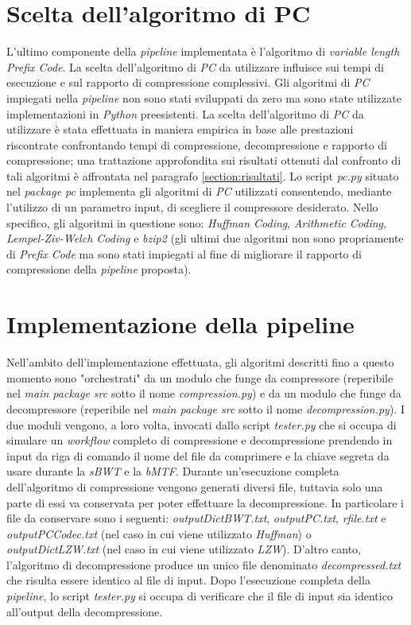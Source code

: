 \section{Scelta dell'algoritmo di PC} 
L'ultimo componente della \emph{pipeline} implementata è l'algoritmo di \emph{variable length Prefix Code}. La scelta dell'algoritmo di \emph{PC} da utilizzare influisce sui tempi di esecuzione e sul rapporto di compressione complessivi. Gli algoritmi di \emph{PC} impiegati nella \emph{pipeline} non sono stati sviluppati da zero ma sono state utilizzate implementazioni in \emph{Python} preesistenti. La scelta dell'algoritmo di \emph{PC} da utilizzare è stata effettuata in maniera empirica in base alle prestazioni riscontrate confrontando tempi di compressione, decompressione e rapporto di compressione; una trattazione approfondita sui risultati ottenuti dal confronto di tali algoritmi è affrontata nel paragrafo \ref{section:risultati}. Lo script \emph{pc.py} situato nel \emph{package pc} implementa gli algoritmi di \emph{PC} utilizzati consentendo, mediante l'utilizzo di un parametro input, di scegliere il compressore desiderato. Nello specifico, gli algoritmi in questione sono: \emph{Huffman Coding}, \emph{Arithmetic Coding}, \emph{Lempel-Ziv-Welch Coding} e \emph{bzip2} (gli ultimi due algoritmi non sono propriamente di \emph{Prefix Code} ma sono stati impiegati al fine di migliorare il rapporto di compressione della \emph{pipeline} proposta).
\section{Implementazione della pipeline}
Nell'ambito dell'implementazione effettuata, gli algoritmi descritti fino a questo momento sono "orchestrati" da un modulo che funge da compressore (reperibile nel \emph{main package src} sotto il nome \emph{compression.py}) e da un modulo che funge da decompressore (reperibile nel \emph{main package src} sotto il nome \emph{decompression.py}). I due moduli vengono, a loro volta, invocati dallo script \emph{tester.py} che si occupa di simulare un \emph{workflow} completo di compressione e decompressione prendendo in input da riga di comando il nome del file da comprimere e la chiave segreta da usare durante la \emph{sBWT} e la \emph{bMTF}. Durante un'esecuzione completa dell'algoritmo di compressione vengono generati diversi file, tuttavia solo una parte di essi va conservata per poter effettuare la decompressione. In particolare i file da conservare sono i seguenti: \emph{outputDictBWT.txt}, \emph{outputPC.txt}, \emph{rfile.txt} e \emph{outputPCCodec.txt} (nel caso in cui viene utilizzato \emph{Huffman}) o \emph{outputDictLZW.txt} (nel caso in cui viene utilizzato \emph{LZW}). D'altro canto, l'algoritmo di decompressione produce un unico file denominato \emph{decompressed.txt} che risulta essere identico al file di input. Dopo l'esecuzione completa della \emph{pipeline}, lo script \emph{tester.py} si occupa di verificare che il file di input sia identico all'output della decompressione.